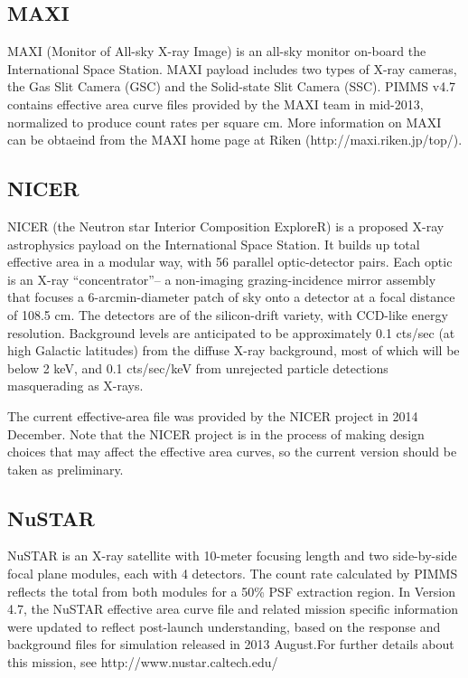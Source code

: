 \subsection{MAXI}
MAXI (Monitor of All-sky X-ray Image) is an all-sky monitor on-board the
International Space Station. MAXI payload includes two types of X-ray cameras,
the Gas Slit Camera (GSC) and the Solid-state Slit Camera (SSC). PIMMS v4.7
contains effective area curve files provided by the MAXI team in mid-2013,
normalized to produce count rates per square cm.  More information on MAXI
can be obtaeind from the MAXI home page at Riken (http://maxi.riken.jp/top/).

\subsection{NICER}

NICER (the Neutron star Interior Composition ExploreR) is a proposed X-ray
astrophysics payload on the International Space Station. It builds up total
effective area in a modular way, with 56 parallel optic-detector pairs. Each
optic is an X-ray ``concentrator''-- a non-imaging grazing-incidence mirror
assembly that focuses a 6-arcmin-diameter patch of sky onto a detector at a
focal distance of 108.5 cm. The detectors are of the silicon-drift variety,
with CCD-like energy resolution. Background levels are anticipated to be
approximately 0.1 cts/sec (at high Galactic latitudes) from the diffuse
X-ray background, most of which will be below 2 keV, and 0.1 cts/sec/keV
from unrejected particle detections masquerading as X-rays.

The current effective-area file was provided by the NICER project in 2014
December. Note that the NICER project is in the process of making design
choices that may affect the effective area curves, so the current version
should be taken as preliminary.

\subsection{NuSTAR}

NuSTAR is an X-ray satellite with 10-meter focusing length and two
side-by-side focal plane modules, each with 4 detectors.  The count rate
calculated by PIMMS reflects the total from both modules for a 50\% PSF
extraction region. In Version 4.7, the NuSTAR effective area curve file
and related mission specific information were updated to reflect post-launch
understanding, based on the response and background files for simulation
released in 2013 August.For further details about this mission, see
  http://www.nustar.caltech.edu/

